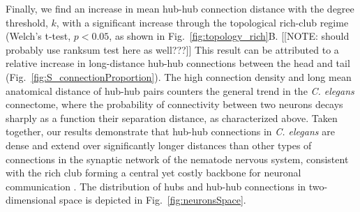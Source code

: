 \documentclass[10pt,letterpaper]{article}
\begin{document}
Finally, we find an increase in mean hub-hub connection distance with the degree threshold, $k$, with a significant increase through the topological rich-club regime (Welch's t-test, $p < 0.05$, as shown in Fig.~\ref{fig:topology_rich}B.
[[NOTE: should probably use ranksum test here as well???]]
This result can be attributed to a relative increase in long-distance hub-hub connections between the head and tail (Fig.~\ref{fig:S_connectionProportion}).
The high connection density and long mean anatomical distance of hub-hub pairs counters the general trend in the \emph{C. elegans} connectome, where the probability of connectivity between two neurons decays sharply as a function their separation distance, as characterized above.
Taken together, our results demonstrate that hub-hub connections in \emph{C. elegans} are dense and extend over significantly longer distances than other types of connections in the synaptic network of the nematode nervous system, consistent with the rich club forming a central yet costly backbone for neuronal communication \cite{vandenHeuvel:2012kh}.
The distribution of hubs and hub-hub connections in two-dimensional space is depicted in Fig.~\ref{fig:neuronsSpace}.




\end{document}

